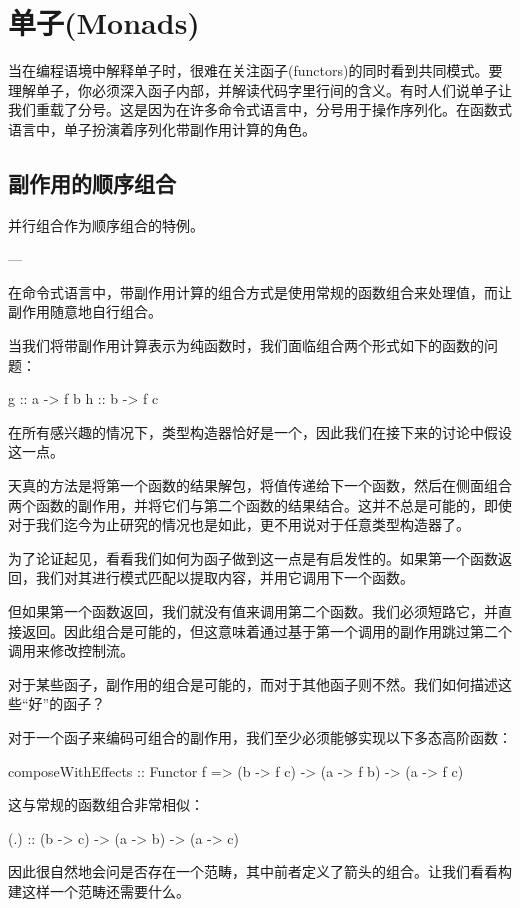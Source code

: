 \documentclass[DaoFP]{subfiles}
\begin{document}
\setcounter{chapter}{14}

\chapter{单子(Monads)}

当在编程语境中解释单子时，很难在关注函子(functors)的同时看到共同模式。要理解单子，你必须深入函子内部，并解读代码字里行间的含义。有时人们说单子让我们重载了分号。这是因为在许多命令式语言中，分号用于操作序列化。在函数式语言中，单子扮演着序列化带副作用计算的角色。

\section{副作用的顺序组合}

并行组合作为顺序组合的特例。

---

在命令式语言中，带副作用计算的组合方式是使用常规的函数组合来处理值，而让副作用随意地自行组合。

当我们将带副作用计算表示为纯函数时，我们面临组合两个形式如下的函数的问题：
\begin{haskell}
g :: a -> f b
h :: b -> f c
\end{haskell}
在所有感兴趣的情况下，类型构造器恰好是一个，因此我们在接下来的讨论中假设这一点。

天真的方法是将第一个函数的结果解包，将值传递给下一个函数，然后在侧面组合两个函数的副作用，并将它们与第二个函数的结果结合。这并不总是可能的，即使对于我们迄今为止研究的情况也是如此，更不用说对于任意类型构造器了。

为了论证起见，看看我们如何为函子做到这一点是有启发性的。如果第一个函数返回，我们对其进行模式匹配以提取内容，并用它调用下一个函数。

但如果第一个函数返回，我们就没有值来调用第二个函数。我们必须短路它，并直接返回。因此组合是可能的，但这意味着通过基于第一个调用的副作用跳过第二个调用来修改控制流。

对于某些函子，副作用的组合是可能的，而对于其他函子则不然。我们如何描述这些“好”的函子？

对于一个函子来编码可组合的副作用，我们至少必须能够实现以下多态高阶函数：
\begin{haskell}
composeWithEffects :: Functor f => 
       (b -> f c) -> (a -> f b) -> (a -> f c)
\end{haskell}
这与常规的函数组合非常相似：
\begin{haskell}
(.) :: (b -> c) -> (a -> b) -> (a -> c)
\end{haskell}
因此很自然地会问是否存在一个范畴，其中前者定义了箭头的组合。让我们看看构建这样一个范畴还需要什么。
\end{document}
